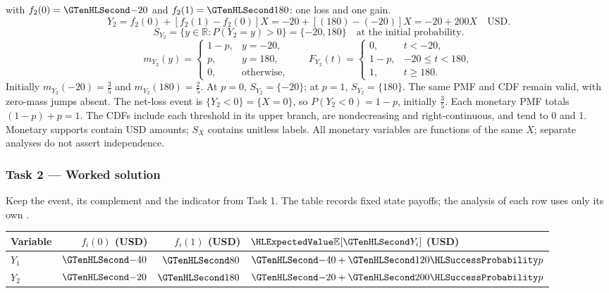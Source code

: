 with $f_2(0)=\Money{-20}$ and $f_2(1)=\Money{180}$: one loss and one gain.
\[
Y_2=f_2(0)+[f_2(1)-f_2(0)]X=-20+[(180)-(-20)]X=-20+200X\quad\text{USD}.
\]
\[S_{Y_2}=\{y\in\mathbb R:P(Y_2=y)>0\}=\{-20,180\}\quad\text{at the initial probability}.\]
\[
m_{Y_2}(y)=\begin{cases}1-p,&y=-20,\\p,&y=180,\\0,&\text{otherwise},\end{cases}
\qquad F_{Y_2}(t)=\begin{cases}0,&t<-20,\\1-p,&-20\leq t<180,\\1,&t\geq 180.\end{cases}
\]
Initially $m_{Y_2}(-20)=\frac{3}{5}$ and $m_{Y_2}(180)=\frac{2}{5}$.
At $p=0$, $S_{Y_2}=\{-20\}$; at $p=1$, $S_{Y_2}=\{180\}$.
The same PMF and CDF remain valid, with zero-mass jumps absent.
The net-loss event is $\{Y_2<0\}=\{X=0\}$, so $P(Y_2<0)=1-p$,
initially $\frac{3}{5}$.
Each monetary PMF totals $(1-p)+p=1$. The CDFs include each threshold
in its upper branch, are nondecreasing and right-continuous, and tend to 0 and 1.
Monetary supports contain USD amounts; $S_X$ contains unitless labels.
All monetary variables are functions of the same $X$; separate analyses do not assert independence.
\clearpage\subsubsection*{Task 2 --- Worked solution}\label{sol:c3-inventory-decision}
Keep the event, its complement and the indicator from Task 1.
The table records fixed state payoffs; the analysis of each row uses only its own .
\begin{center}\begin{tabular}{lrrl}\toprule
Variable & $f_i(0)$ (USD) & $f_i(1)$ (USD) & $\ExpectedValue{\mathbb E}[\Money{Y_i}]$ (USD)\\\midrule
$Y_1$ & $\Money{-40}$ & $\Money{80}$ & $\Money{-40}+\Money{120}\SuccessProb{p}$\\
$Y_2$ & $\Money{-20}$ & $\Money{180}$ & $\Money{-20}+\Money{200}\SuccessProb{p}$\\
\bottomrule\end{tabular}\end{center}
